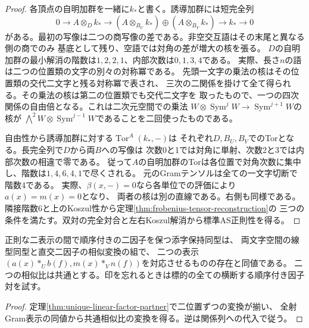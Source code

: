 \begin{proof}
各頂点の自明加群を一緒に$k_*$と書く。誘導加群には短完全列
\[
 0\longrightarrow A\otimes_D k_*\longrightarrow
 (A\otimes_{B_U} k_*)\oplus(A\otimes_{B_V} k_*)\longrightarrow k_*\longrightarrow0
\]
がある。最初の写像は二つの商写像の差である。非空交互語はその末尾と異なる側の商でのみ
基底として残り、空語では対角の差が増大の核を張る。
$D$の自明加群の最小解消の階数は$1,2,2,1$、内部次数は$0,1,3,4$である。
実際、長さ$n$の語は二つの位置類の文字の別々の対称冪である。
先頭一文字の乗法の核はその位置類の交代二文字と残る対称冪で表され、
三次の二関係を掛けて全て得られる。その乗法の核は第二の位置類でも交代二文字を
取ったもので、一つの四次関係の自由倍となる。これは二次元空間での乗法
$W\otimes\operatorname{Sym}^j W\to\operatorname{Sym}^{j+1}W$の核が
$\bigwedge^2W\otimes\operatorname{Sym}^{j-1}W$であることを二回使ったものである。

自由性から誘導加群に対する$\operatorname{Tor}^A(k_*,-)$は
それぞれ$D,B_U,B_V$でのTorとなる。長完全列で$D$から両$B$への写像は
次数0と1では対角に単射、次数2と3では内部次数の相違で零である。
従って$A$の自明加群のTorは各位置で対角次数に集中し、階数は$1,4,6,4,1$で尽くされる。
元のGramテンソルは全ての一文字切断で階数4である。
実際、$\beta(x,-)=0$なら各単位での評価により$a(x)=m(x)=0$となり、
両者の核は別の直線である。右側も同様である。
隣接階数6と上のKoszul性から定理\ref{thm:frobenius-tensor-reconstruction}の
三つの条件を満たす。双対の完全対合と左右Koszul解消から標準AS正則性を得る。
\end{proof}

\begin{corollary}[印のある横断チャートの同型]
正則な二表示の間で順序付きの二因子を保つ添字保持同型は、
両文字空間の線型同型と直交二因子の相似変換の組で、
二つの表示$(a(x)*_U b(f),m(x)*_V n(f))$を対応させるものの存在と同値である。
二つの相似比は共通とする。印を忘れるときは標的の全ての横断する順序付き因子対を試す。
\end{corollary}
\begin{proof}
定理\ref{thm:unique-linear-factor-partner}で二位置ずつの変換が揃い、
全射Gram表示の同値から共通相似比の変換を得る。逆は関係列への代入で従う。
\end{proof}

